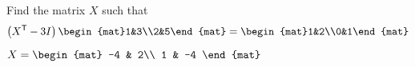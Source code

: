 
\begin{Exercise}[
name={},
title={}, 
difficulty=0,
origin={\cite{MH}}]
Find the matrix $X$ such that\qquad \[\left(\trans{X}-3I\right)\begin{mat}1&3\\2&5\end{mat}=\begin{mat}1&2\\0&1\end{mat}\]
\end{Exercise}

\begin{Answer}
$X=\begin{mat}
-4 & 2\\
1 & -4
\end{mat}$
\end{Answer}
